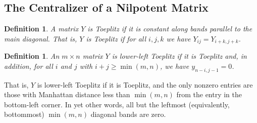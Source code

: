 \documentclass[12pt,psamsfonts]{article}
\newtheorem{definition}[theorem]{Definition}
\begin{document}
\subsection{The Centralizer of a Nilpotent Matrix}
\begin{definition}
    A matrix \(Y\) is \emph{Toeplitz} if it is constant along bands parallel to the main diagonal.
    That is, \(Y\) is Toeplitz if for all \(i,j,k\) we have \(Y_{ij} = Y_{i + k, j + k}\).
\end{definition}
\begin{definition}
    An \(m \times n\) matrix \(Y\) is \emph{lower-left Toeplitz} if it is Toeplitz and, in addition, for all \(i\) and \(j\) with \(i + j \geq \min(m,n)\), we have \(y_{n - i, j - 1} = 0\).
\end{definition}
That is, \(Y\) is lower-left Toeplitz if it is Toeplitz, and the only nonzero entries are those with Manhattan distance less than \(\min(m,n)\) from the entry in the bottom-left corner.
In yet other words, all but the leftmost (equivalently, bottommost) \(\min(m,n)\) diagonal bands are zero.
\end{document}

